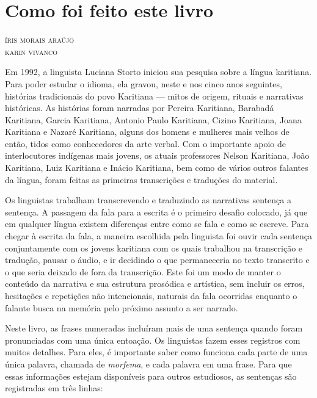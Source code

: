 \chapter{Como foi feito este livro}

\begin{flushright}
\textsc{íris morais araújo}\\
\textsc{karin vivanco}
\end{flushright}

\noindent{}Em 1992, a linguista Luciana Storto
iniciou sua pesquisa sobre a língua karitiana. Para poder estudar o
idioma, ela gravou, neste e nos cinco anos seguintes, histórias
tradicionais do povo Karitiana --- mitos de origem, rituais e narrativas
históricas. As histórias foram narradas por Pereira Karitiana, Barabadá
Karitiana, Garcia Karitiana, Antonio Paulo Karitiana, Cizino Karitiana,
Joana Karitiana e Nazaré Karitiana, alguns dos homens e mulheres mais
velhos de então, tidos como conhecedores da arte verbal. Com o
importante apoio de interlocutores indígenas mais jovens, os atuais
professores Nelson Karitiana, João Karitiana, Luiz Karitiana e Inácio
Karitiana, bem como de vários outros falantes da língua, foram feitas as
primeiras transcrições e traduções do material.

Os linguistas trabalham transcrevendo e traduzindo as narrativas
sentença a sentença. A passagem da fala para a escrita é o primeiro
desafio colocado, já que em qualquer língua existem diferenças entre
como se fala e como se escreve. Para chegar à escrita da fala, a maneira
escolhida pela linguista foi ouvir cada sentença conjuntamente com os
jovens karitiana com os quais trabalhou na transcrição e tradução,
pausar o áudio, e ir decidindo o que permaneceria no texto transcrito e
o que seria deixado de fora da transcrição. Este foi um modo de manter o
conteúdo da narrativa e sua estrutura prosódica e artística, sem incluir
os erros, hesitações e repetições não intencionais, naturais da fala
ocorridas enquanto o falante busca na memória pelo próximo assunto a ser
narrado.

Neste livro, as frases numeradas incluíram mais de uma sentença quando
foram pronunciadas com uma única entoação. Os linguistas fazem esses
registros com muitos detalhes. Para eles, é importante saber como
funciona cada parte de uma única palavra, chamada de \textit{morfema}, e
cada palavra em uma frase. Para que essas informações estejam
disponíveis para outros estudiosos, as sentenças são registradas em três
linhas: 

